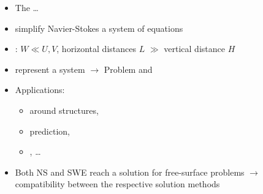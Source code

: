 \begin{frame}
\hspace{3.5cm}
\begin{minipage}{0.7\textwidth}
\begin{tcolorbox}[colframe=TUMGreen,
colback=TUMGreen!30]     
\begin{itemize}
\setlength\itemsep{1.9em}
\item<1->[] The \textbf{} \dots
\item<1-> simplify  Navier-Stokes  a  system of equations
\item<1-> :  $ W \ll U,V $, horizontal distances $L$ $\gg$ vertical distance $H$
\item<1-> represent a  system $\rightarrow$  Problem and 
\item<1-> Applications: 
\begin{itemize}
\addtolength{\itemindent}{1cm}
\item {} around structures, 
\item {} prediction,
\item {}, \dots
\end{itemize}
\end{itemize}
\end{tcolorbox}
\addtolength{\leftmargini}{-0.8cm}
\begin{itemize}
\item<2->[]
\begin{tcolorbox}[colframe=TUMOrange,
colback=TUMOrange!30] 
Both NS and SWE reach a solution for free-surface problems $\rightarrow$ compatibility between the respective solution methods
\end{tcolorbox}
\end{itemize}
\end{minipage}
\end{frame}
\clearpage




